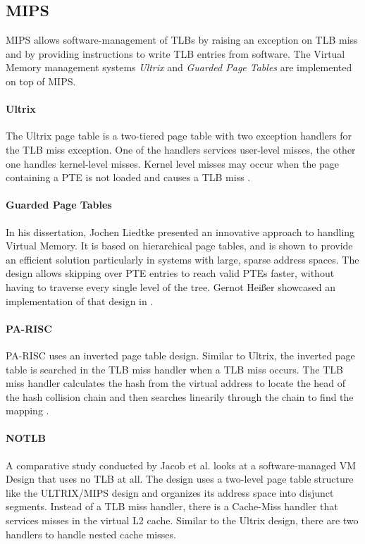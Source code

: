\subsection{MIPS}
MIPS \cite{MIPSArchitectureProgrammers2016} allows software-management of TLBs by raising an exception on TLB miss and by providing instructions to write TLB entries from software.
The Virtual Memory management systems \textit{Ultrix} and \textit{Guarded Page Tables} are implemented on top of MIPS.

\paragraph{Ultrix} The Ultrix page table is a two-tiered page table with two exception handlers for the TLB miss exception.
One of the handlers services user-level misses, the other one handles kernel-level misses.
Kernel level misses may occur when the page containing a PTE is not loaded and causes a
TLB miss \cite{jacob1998look}.

\paragraph{Guarded Page Tables} In his dissertation, Jochen Liedtke presented an innovative approach
to handling Virtual Memory\cite{liedtkeGPT}.
It is based on hierarchical page tables, and is shown to provide an efficient solution particularly in systems with large, sparse address spaces.
The design allows skipping over PTE entries to reach valid PTEs faster, without having to traverse every single level of the tree.
Gernot Heißer showcased an implementation of that design in \cite{heiserAnatomyHighPerformanceMicrokernel}.

\paragraph{PA-RISC}
PA-RISC uses an inverted page table design. Similar to Ultrix, the inverted page table is searched in the TLB miss handler when a TLB miss occurs.
The TLB miss handler calculates the hash from the virtual address to locate the head of the hash collision chain and then searches linearily through the chain to find the mapping \cite{jacob1998look}.

\paragraph{NOTLB}
A comparative study conducted by Jacob et al. \cite{jacob1998look} looks at a software-managed VM Design that uses no TLB at all.
The design uses a two-level page table structure like the ULTRIX/MIPS design and organizes its address space into disjunct segments.
Instead of a TLB miss handler, there is a Cache-Miss handler that services misses in the virtual L2 cache.
Similar to the Ultrix design, there are two handlers to handle nested cache misses.


